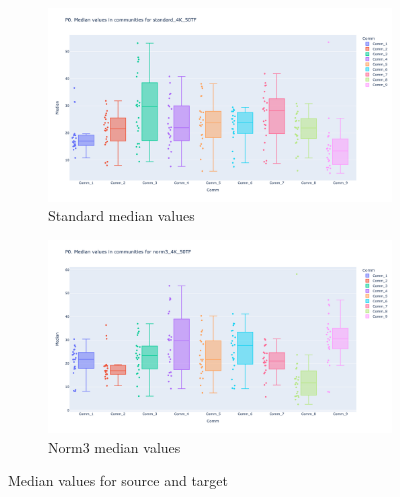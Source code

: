 \begin{figure}[H]
    \captionsetup[subfigure]{justification=Centering}
    \begin{subfigure}[t]{0.5\textwidth}
        \includegraphics[width=\textwidth]{Images/P0/standard_4K_50TF_median.png}
        \caption{Standard median values}
    \end{subfigure}\hspace{\fill} %
    \bigskip %
    \begin{subfigure}[t]{0.5\textwidth}
        \includegraphics[width=\linewidth]{Images/P0/norm3_4K_50TF_median.png}
        \caption{Norm3 median values}
    \end{subfigure}\hspace{\fill} %
    \caption{Median values for source and target}
    \label{fig:N_I:P0_median}
\end{figure}



